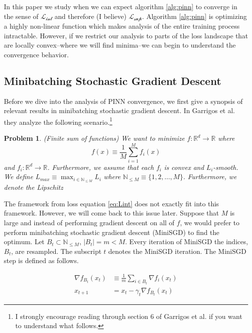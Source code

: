 \documentclass[12pt]{article}
\newtheorem{problem}{Problem}
\def\t{\text}
\begin{document}
In this paper we study when we can expect algorithm \ref{alg:pinn} to converge in the sense of $\mathcal{L_{\t{int}}}$ and therefore (I believe) $\mathcal{L_{\text{sup}}}$. Algorithm \ref{alg:pinn} is optimizing a highly non-linear function which makes analysis of the entire training process intractable. However, if we restrict our analysis to parts of the loss landscape that are locally convex--where we will find minima--we can begin to understand the convergence behavior.

\subsection{Minibatching Stochastic Gradient Descent}

Before we dive into the analysis of PINN convergence, we first give a synopsis of relevant results in minibatching stochastic gradient descent. In Garrigos et al. \cite{gd} they analyze the following scenario.\footnote{I strongly encourage reading through section 6 of Garrigos et al. \cite{gd} if you want to understand what follows.}

\begin{problem} \label{prob:sum}
    (Finite sum of functions) We want to minimize $f: \mathbb{R}^d \to \mathbb{R}$
    where
    \begin{equation}
        f(x) \equiv \frac{1}{M} \sum_{i=1}^{M} f_i(x)
    \end{equation}
    and $f_i: \mathbb{R}^d \to \mathbb{R}$. Furthermore, we assume that each $f_i$ is convex and $L_i$-smooth. We define $L_{max} \equiv \max_{i \in \mathbb{N}_{\leq M}} L_i$ where $\mathbb{N}_{\leq M} \equiv \{1,2,\hdots, M \}$. Furthermore, we denote the Lipschitz 
\end{problem}

The framework from loss equation \ref{eq:Lint} does not exactly fit into this framework. However, we will come back to this issue later. Suppose that $M$ is large and instead of performing gradient descent on all of $f$, we would prefer to perform minibatching stochastic gradient descent (MiniSGD) to find the optimum. Let $B_t \subset \mathbb{N}_{\leq M}$, $|B_t| = m < M$. Every iteration of MiniSGD the indices, $B_t$, are resampled. The subscript $t$ denotes the MiniSGD iteration. The MiniSGD step is defined as follows.

\begin{align}
    \nabla f_{B_t}(x_t) &\equiv \frac{1}{m} \sum_{i \in B_t} \nabla f_i(x_t)\\
    x_{t+1} &= x_t - \gamma_t \nabla f_{B_t}(x_t)
\end{align}
\end{document}
